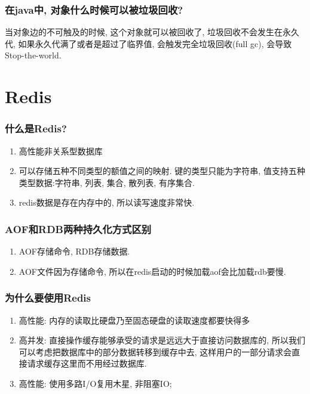 \documentclass[UTF8]{ctexart}
\begin{document}
\subsubsection{在java中, 对象什么时候可以被垃圾回收?}
当对象边的不可触及的时候, 这个对象就可以被回收了, 垃圾回收不会发生在永久代, 如果永久代满了或者是超过了临界值, 会触发完全垃圾回收(full gc), 会导致Stop-the-world. 
	\section{Redis}
	\subsubsection{什么是Redis?}
	\begin{enumerate}
		\item 高性能非关系型数据库
		\item 可以存储五种不同类型的额值之间的映射. 键的类型只能为字符串, 值支持五种类型数据:字符串, 列表, 集合, 散列表, 有序集合.
		\item redis数据是存在内存中的, 所以读写速度非常快.
		
	\end{enumerate}
	\subsubsection{AOF和RDB两种持久化方式区别}
	\begin{enumerate}
		\item AOF存储命令, RDB存储数据.
		\item AOF文件因为存储命令, 所以在redis启动的时候加载aof会比加载rdb要慢. 
	\end{enumerate}
	\subsubsection{为什么要使用Redis}
	\begin{enumerate}
		\item 高性能: 内存的读取比硬盘乃至固态硬盘的读取速度都要快得多
		\item 高并发: 直接操作缓存能够承受的请求是远远大于直接访问数据库的, 所以我们可以考虑把数据库中的部分数据转移到缓存中去, 这样用户的一部分请求会直接请求缓存这里而不用经过数据库. 
		\item 高性能: 使用多路I/O复用木星, 非阻塞IO;
	\end{enumerate}
\end{document}
